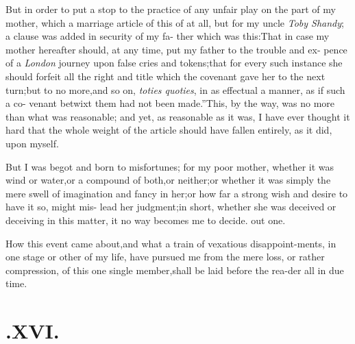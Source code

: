 \documentclass{article}
\begin{document}
But in order to put a stop to the practice of any unfair play on
the part of my mother, which a marriage article of this
of at all, but for my uncle \textit{Toby Shandy};\tsk\break 
a clause was added in security of my fa-\break
ther which was this:\tsk \lqq That in case my\break
\lqq mother hereafter should, at any time,\break
\lqq put my father to the trouble and ex-\break
\lqq pence of a \textit{London} journey upon false\break
\lqq cries and tokens;\tsh that for every\break
\lqq such instance she should forfeit all the\break
\lqq right and title which the covenant gave\break
\lqq her to the next turn;\tsh but to no\break
\lqq more,\tsk and so on, \textit{toties quoties}, in as\break
\lqq effectual a manner, as if such a co-\break
\lqq venant betwixt them had not been\break
\lqq made.”\tsk This, by the way, was no\break
more than what was reasonable;\tsk
and yet, as reasonable as
it was, I have ever thought it hard that the whole weight of the
article should have fallen entirely, as\break
it did, upon myself.\\
\newpage

But I was begot and born to misfortunes;\tsk 
for my poor mother, whether\break
it was wind or water,\tsk or a compound\break
of both,\tsk or neither;\tsk or whether it\break
was simply the mere swell of imagination\break
and fancy in her;\tsk or how far a strong\break
wish and desire to have it so, might mis-\break
lead her judgment;\tsk in short, whether\break
she was deceived or deceiving in this\break
matter, it no way becomes me to decide.\break 
{} 
out one.

How this event came about,\tsk and what a train of vexatious
disappoint-\break ments, in one stage or other of my life, have pursued me
from the mere loss, or rather compression, of this one single
member,\tsk shall be laid before the rea-\break der all in due time.

\null
\section{.\enspace XVI.}
\end{document}
